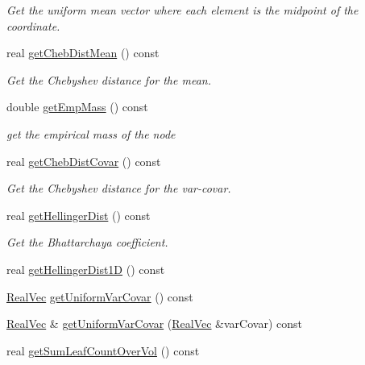 \begin{DoxyCompactItemize}
\begin{DoxyCompactList}\small\item\em \-Get the uniform mean vector where each element is the midpoint of the coordinate. \end{DoxyCompactList}\item 
real \hyperlink{classsubpavings_1_1SPSVnode_a24fc7b09a8293edce2e3b602763a45e3}{get\-Cheb\-Dist\-Mean} () const 
\begin{DoxyCompactList}\small\item\em \-Get the \-Chebyshev distance for the mean. \end{DoxyCompactList}\item 
double \hyperlink{classsubpavings_1_1SPSVnode_afb9e32e6d78db527309d95ccc8c0049f}{get\-Emp\-Mass} () const 
\begin{DoxyCompactList}\small\item\em get the empirical mass of the node \end{DoxyCompactList}\item 
real \hyperlink{classsubpavings_1_1SPSVnode_a63ea0f67b354888a8a12c0ffc81b0e5e}{get\-Cheb\-Dist\-Covar} () const 
\begin{DoxyCompactList}\small\item\em \-Get the \-Chebyshev distance for the var-\/covar. \end{DoxyCompactList}\item 
real \hyperlink{classsubpavings_1_1SPSVnode_a2e0a1a393daed9e3f5887162b68b0e6e}{get\-Hellinger\-Dist} () const 
\begin{DoxyCompactList}\small\item\em \-Get the \-Bhattarchaya coefficient. \end{DoxyCompactList}\item 
real \hyperlink{classsubpavings_1_1SPSVnode_a3b56f3b8a024ab6929087e803e7af765}{get\-Hellinger\-Dist1\-D} () const 
\item 
\hyperlink{namespacesubpavings_af2d57bb6e12f4a73169f2e496d6a641f}{\-Real\-Vec} \hyperlink{classsubpavings_1_1SPSVnode_a0a9c9ba4802d37fdb0ee1fff25908fbb}{get\-Uniform\-Var\-Covar} () const 
\item 
\hyperlink{namespacesubpavings_af2d57bb6e12f4a73169f2e496d6a641f}{\-Real\-Vec} \& \hyperlink{classsubpavings_1_1SPSVnode_ab1f050670fdcdc6f68e009a0cba0ed35}{get\-Uniform\-Var\-Covar} (\hyperlink{namespacesubpavings_af2d57bb6e12f4a73169f2e496d6a641f}{\-Real\-Vec} \&var\-Covar) const 
\item 
real \hyperlink{classsubpavings_1_1SPSVnode_ac741a9772d992ba74911cf692e1ed772}{get\-Sum\-Leaf\-Count\-Over\-Vol} () const 

\end{DoxyCompactItemize}
